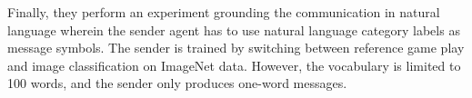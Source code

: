 Finally, they perform an experiment grounding the communication in natural language wherein the sender agent has to use natural language category labels as message symbols. The sender is trained by switching between reference game play and image classification on ImageNet data. However, the vocabulary is limited to 100 words, and the sender only produces one-word messages. %
	
